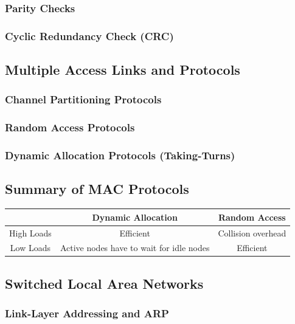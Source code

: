 \documentclass[12pt]{article}
\begin{document}
\subsubsection{Parity Checks}

\subsubsection{Cyclic Redundancy Check (CRC)}

\subsection{Multiple Access Links and Protocols}

\subsubsection{Channel Partitioning Protocols}

\subsubsection{Random Access Protocols}

\subsubsection{Dynamic Allocation Protocols (Taking-Turns)}

\subsection*{Summary of MAC Protocols}

\begin{tabular}{ | c | c | c | }
    \hline
    & Dynamic Allocation & Random Access \\ \hline
    High Loads & Efficient & Collision overhead \\ \hline
    Low  Loads & Active nodes have to wait for idle nodes & Efficient \\ \hline
\end{tabular}

\subsection{Switched Local Area Networks}

\subsubsection{Link-Layer Addressing and ARP}
\end{document}
